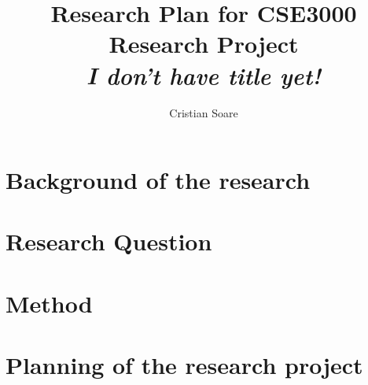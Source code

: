 \documentclass[english, a4paper]{article}
\title{
    Research Plan for CSE3000 Research Project\\
    {\Large \textit{I don't have title yet!}}
}
\author{Cristian Soare}
\begin{document}
\maketitle

\section*{Background of the research}

\section*{Research Question}

\section*{Method}
\textcite{dummy2023}

\section*{Planning of the research project}

\printbibliography
\end{document}
